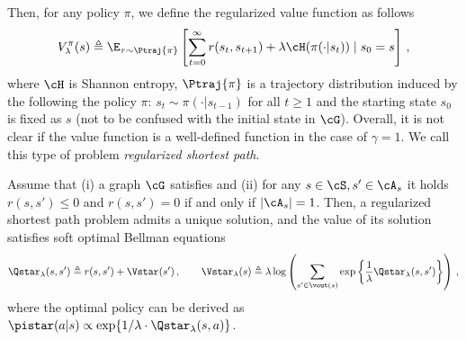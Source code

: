 Then, for any policy $\pi$, we define the regularized value function as follows
\begin{equation}\label{eq:reg_value_function_def}
    V^{\pi}_{\lambda}(s) \triangleq \E_{\tau \sim \Ptraj{\pi}}\left[ \sum_{t=0}^\infty r(s_t, s_{t+1}) + \lambda \cH(\pi(\cdot| s_t))  \mid s_0 = s \right] \,,
\end{equation}
where $\cH$ is Shannon entropy, $\Ptraj{\pi}$ is a trajectory distribution induced by the following the policy $\pi$: $s_t \sim \pi(\cdot | s_{t-1})$  for all $t \geq 1$ and the starting state $s_0$ is fixed as $s$ (not to be confused with the initial state in $\cG$). Overall, it is not clear if the value function is a well-defined function in the case of $\gamma = 1$. We call this type of problem \textit{regularized shortest path}.

\begin{lemma}\label{lem:uniqeness_reg_shortest_path}
    Assume that (i) a graph $\cG$ satisfies  and (ii) for any $s \in \cS, s' \in \cA_s$ it holds $r(s,s') \leq 0$ and $r(s,s') = 0$ if and only if $|\cA_s| = 1$. Then, a regularized shortest path problem admits a unique solution, and the value of its solution satisfies soft optimal Bellman equations
    \begin{equation}\label{eq:reg_optimal_bellman}
        \Qstar_{\lambda}(s,s') \triangleq r(s,s') + \Vstar(s')\,, \qquad \Vstar_{\lambda}(s) \triangleq \lambda \log\left( \sum_{s' \in \vout(s)} \exp\left\{ \frac{1}{\lambda} \Qstar_{\lambda}(s,s') \right\} \right)\,,
    \end{equation}
    where the optimal policy can be derived as $\pistar(a|s) \propto \exp\{1/\lambda \cdot \Qstar_{\lambda}(s,a)\}$. 
\end{lemma}
